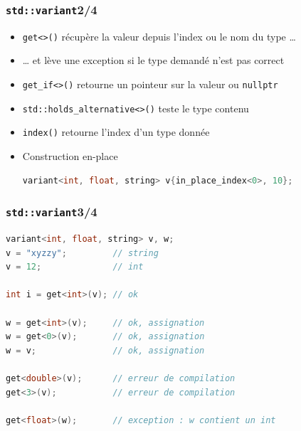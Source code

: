 \documentclass[C++.tex]{subfiles}
\begin{document}
\begin{frame}[fragile]
	\frametitle{\lstinline|std::variant|\titlehfill{}2/4}
	\begin{itemize}
		\item \lstinline|get<>()| récupère la valeur depuis l'index ou le nom du type \ldots
		\item \ldots{} et lève une exception si le type demandé n'est pas correct
		\item \lstinline|get_if<>()| retourne un pointeur sur la valeur ou \lstinline|nullptr|

		\item \lstinline|std::holds_alternative<>()| teste le type contenu
		\item \lstinline|index()| retourne l'index d'un type donnée

		\item Construction en-place
		
		\begin{lstlisting}[language=C++]
variant<int, float, string> v{in_place_index<0>, 10};\end{lstlisting}
		

	\end{itemize}
\end{frame}

\begin{frame}[fragile]
	\frametitle{\lstinline|std::variant|\titlehfill{}3/4}
	\begin{lstlisting}[language=C++]
variant<int, float, string> v, w;
v = "xyzzy";         // string
v = 12;              // int

int i = get<int>(v); // ok

w = get<int>(v);     // ok, assignation
w = get<0>(v);       // ok, assignation
w = v;               // ok, assignation

get<double>(v);      // erreur de compilation
get<3>(v);           // erreur de compilation

get<float>(w);       // exception : w contient un int\end{lstlisting}
\end{frame}
\end{document}
